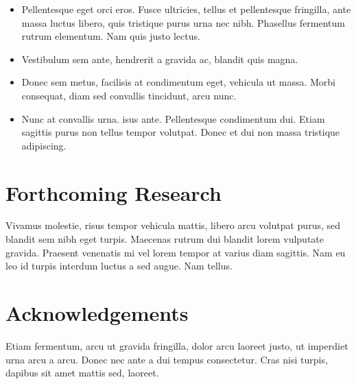 \documentclass[a0,landscape]{a0poster}
\begin{document}
\begin{multicols}{3}
\begin{itemize}
\item Pellentesque eget orci eros. Fusce ultricies, tellus et pellentesque fringilla, ante massa luctus libero, quis tristique purus urna nec nibh. Phasellus fermentum rutrum elementum. Nam quis justo lectus.
\item Vestibulum sem ante, hendrerit a gravida ac, blandit quis magna.
\item Donec sem metus, facilisis at condimentum eget, vehicula ut massa. Morbi consequat, diam sed convallis tincidunt, arcu nunc.
\item Nunc at convallis urna. isus ante. Pellentesque condimentum dui. Etiam sagittis purus non tellus tempor volutpat. Donec et dui non massa tristique adipiscing.
\end{itemize}

\color{DarkSlateGray} %


\section*{Forthcoming Research}

Vivamus molestie, risus tempor vehicula mattis, libero arcu volutpat purus, sed blandit sem nibh eget turpis. Maecenas rutrum dui blandit lorem vulputate gravida. Praesent venenatis mi vel lorem tempor at varius diam sagittis. Nam eu leo id turpis interdum luctus a sed augue. Nam tellus.


\nocite{*} %


\section*{Acknowledgements}

Etiam fermentum, arcu ut gravida fringilla, dolor arcu laoreet justo, ut imperdiet urna arcu a arcu. Donec nec ante a dui tempus consectetur. Cras nisi turpis, dapibus sit amet mattis sed, laoreet.


\end{multicols}
\end{document}
